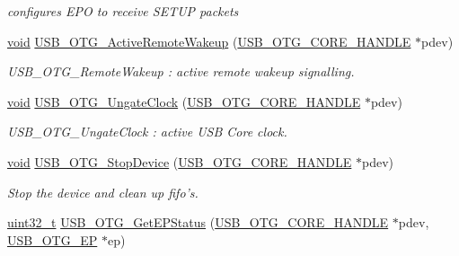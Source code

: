 \begin{DoxyCompactItemize}
\begin{DoxyCompactList}\small\item\em configures E\-P\-O to receive S\-E\-T\-U\-P packets \end{DoxyCompactList}\item 
\hyperlink{group___n_a_m_e_ga18028b8badbf1ea7e704ccac3c488e82}{void} \hyperlink{group___u_s_b___c_o_r_e___private___functions_ga0b146580d6afa89a08f5528a1823a362}{U\-S\-B\-\_\-\-O\-T\-G\-\_\-\-Active\-Remote\-Wakeup} (\hyperlink{group___u_s_b___c_o_r_e___exported___types_gaf76054c11eb8a3367907aad7ae700e80}{U\-S\-B\-\_\-\-O\-T\-G\-\_\-\-C\-O\-R\-E\-\_\-\-H\-A\-N\-D\-L\-E} $\ast$pdev)
\begin{DoxyCompactList}\small\item\em U\-S\-B\-\_\-\-O\-T\-G\-\_\-\-Remote\-Wakeup \-: active remote wakeup signalling. \end{DoxyCompactList}\item 
\hyperlink{group___n_a_m_e_ga18028b8badbf1ea7e704ccac3c488e82}{void} \hyperlink{group___u_s_b___c_o_r_e___private___functions_ga09056347232b2ad98f4b7ff9eb10d2f6}{U\-S\-B\-\_\-\-O\-T\-G\-\_\-\-Ungate\-Clock} (\hyperlink{group___u_s_b___c_o_r_e___exported___types_gaf76054c11eb8a3367907aad7ae700e80}{U\-S\-B\-\_\-\-O\-T\-G\-\_\-\-C\-O\-R\-E\-\_\-\-H\-A\-N\-D\-L\-E} $\ast$pdev)
\begin{DoxyCompactList}\small\item\em U\-S\-B\-\_\-\-O\-T\-G\-\_\-\-Ungate\-Clock \-: active U\-S\-B Core clock. \end{DoxyCompactList}\item 
\hyperlink{group___n_a_m_e_ga18028b8badbf1ea7e704ccac3c488e82}{void} \hyperlink{group___u_s_b___c_o_r_e___private___functions_ga4d577352c51b0c2620987c1b470000ba}{U\-S\-B\-\_\-\-O\-T\-G\-\_\-\-Stop\-Device} (\hyperlink{group___u_s_b___c_o_r_e___exported___types_gaf76054c11eb8a3367907aad7ae700e80}{U\-S\-B\-\_\-\-O\-T\-G\-\_\-\-C\-O\-R\-E\-\_\-\-H\-A\-N\-D\-L\-E} $\ast$pdev)
\begin{DoxyCompactList}\small\item\em Stop the device and clean up fifo's. \end{DoxyCompactList}\item 
\hyperlink{stdint_8h_a435d1572bf3f880d55459d9805097f62}{uint32\-\_\-t} \hyperlink{group___u_s_b___c_o_r_e___private___functions_ga76441e00ea618894565f3980b2786119}{U\-S\-B\-\_\-\-O\-T\-G\-\_\-\-Get\-E\-P\-Status} (\hyperlink{group___u_s_b___c_o_r_e___exported___types_gaf76054c11eb8a3367907aad7ae700e80}{U\-S\-B\-\_\-\-O\-T\-G\-\_\-\-C\-O\-R\-E\-\_\-\-H\-A\-N\-D\-L\-E} $\ast$pdev, \hyperlink{group___u_s_b___c_o_r_e___exported___types_gad1c65925021e8dac88858e10bb2a7eea}{U\-S\-B\-\_\-\-O\-T\-G\-\_\-\-E\-P} $\ast$ep)

\end{DoxyCompactItemize}
